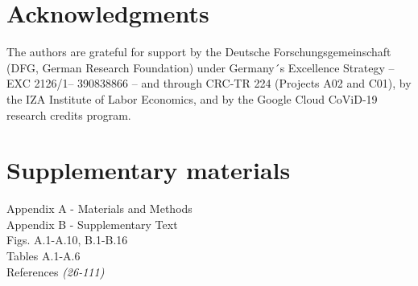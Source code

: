 \documentclass[12pt]{article}
\begin{document}
\section*{Acknowledgments}

The authors are grateful for support by the Deutsche Forschungsgemeinschaft (DFG, German
Research Foundation) under Germany´s Excellence Strategy – EXC 2126/1– 390838866 – and
through CRC-TR 224 (Projects A02 and C01), by the IZA Institute of Labor Economics, and
by the Google Cloud CoViD-19 research credits program.



\section*{Supplementary materials}

Appendix A - Materials and Methods\\
Appendix B - Supplementary Text\\
Figs. A.1-A.10, B.1-B.16\\
Tables A.1-A.6\\
References \textit{(26-111)}
\end{document}
